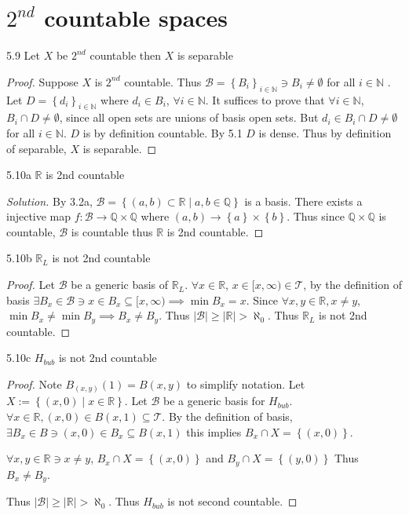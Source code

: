 \documentclass{article}
\newcommand*{\T}{\mathcal{T}}
\newcommand*{\B}{\mathcal{B}}
\newcommand*{\subeq}{\subseteq}
\newcommand{\R}{\mathbb{R}}
\newcommand{\Q}{\mathbb{Q}}
\newcommand{\N}{\mathbb{N}}
\newcommand{\abs}[1]{\left\lvert #1\right\rvert}
\newenvironment{solution}
{\renewcommand\qedsymbol{$\blacksquare$}\begin{proof}[Solution]}
{\end{proof}}
\begin{document}
\pagebreak

\section{$2^{nd}$ countable spaces}

\begin{claim}{5.9}\label{Claim 5.9.}
    Let $X$ be $2^{nd}$ countable then $X$ is separable   
\end{claim}
\begin{proof}
    Suppose $X$ is $2^{nd}$ countable. Thus $\B = \left\{ B_i \right\}_{i \in \N} \ni B_i \neq \emptyset$ for all $i \in \N$ . Let $D = \left\{ d_i \right\}_{i \in \N}$ where $d_i \in B_i$, $\forall i \in \N$. It suffices to prove that $\forall i \in \N$, $B_i \cap D \neq \emptyset$, since all open sets are unions of basis open sets. But $d_i \in B_i \cap D \neq \emptyset$ for all $i \in \N$. $D$ is by definition countable. By 5.1 $D$ is dense. Thus by definition of separable, $X$ is separable.                
\end{proof}

\bigskip

\begin{PROB}{5.10a}\label{Problem 5.10a.}
    $\R$ is 2nd countable 
\end{PROB}
\begin{solution}
    By 3.2a, $\B = \left\{ (a, b) \subset \R \mid a, b \in \Q \right\}$ is a basis. There exists a injective map $f: \B \to \Q \times \Q$ where $(a, b) \to \left\{ a \right\} \times \left\{ b \right\}$. Thus since $\Q \times \Q$ is countable, $\B$ is countable thus $\R$ is 2nd countable.       
\end{solution}
\begin{PROB}{5.10b}\label{Problem 5.10b.}
    $\R_L$ is not 2nd countable 
\end{PROB}
\begin{proof}
    Let $\B$ be a generic basis of $\R_L$. $\forall x \in \R$, $x \in [x, \infty) \in \T$, by the definition of basis $\exists B_x \in \B \ni x \in B_x \subeq [x, \infty) \implies \min B_x = x$. Since $\forall x, y \in \R, x \neq y$, $\min B_x \neq \min B_y \implies B_x \neq B_y$. Thus $\abs{\B} \geq \abs{\R} > \aleph_0$. Thus $\R_L$ is not 2nd countable.          
\end{proof}
\begin{PROB}{5.10c}\label{Problem 5.10c.}
    $H_{bub}$ is not 2nd countable
\end{PROB}
\begin{proof}
    Note $B_{(x, y)}(1) = B(x, y)$ to simplify notation. Let $X := \left\{ (x, 0) \mid x \in \R \right\}$.   
    Let $\B$ be a generic basis for $H_{bub}$. $\forall x \in \R, (x, 0) \in B(x, 1) \subeq \T$. By the definition of basis, $\exists B_x \in B \ni (x, 0) \in B_x \subseteq B(x, 1)$ this implies $B_x \cap X = \left\{ (x, 0) \right\}$.  
    
    
    $\forall x, y \in \R \ni x \neq y$, $B_x \cap X = \left\{ (x, 0) \right\}$ and $B_y \cap X = \left\{ (y, 0) \right\}$ Thus $B_x \neq B_y$. 
    
    Thus $\abs{\B} \geq \abs{\R} > \aleph_0$. Thus $H_{bub}$ is not second countable.   
\end{proof}
\end{document}
